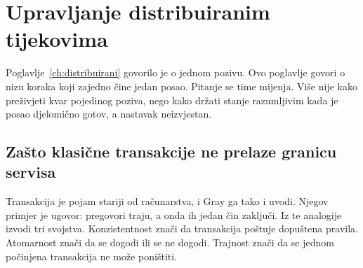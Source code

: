 %
%
\chapter{Upravljanje distribuiranim tijekovima}
\label{ch:tijekovi}

Poglavlje~\ref{ch:distribuirani} govorilo je o jednom pozivu. Ovo poglavlje
govori o nizu koraka koji zajedno čine jedan posao. Pitanje se time mijenja.
Više nije kako preživjeti kvar pojedinog poziva, nego kako držati stanje
razumljivim kada je posao djelomično gotov, a nastavak neizvjestan.

\section{Zašto klasične transakcije ne prelaze granicu servisa}
\label{sec:granica-transakcije}

Transakcija je pojam stariji od računarstva, i Gray ga tako i uvodi. Njegov
primjer je ugovor: pregovori traju, a onda ih jedan čin
zaključi\cite{gray1981transaction}. Iz te analogije izvodi tri svojstva.
Konzistentnost znači da transakcija poštuje dopuštena pravila. Atomarnost
znači da se dogodi ili se ne dogodi. Trajnost znači da se jednom počinjena
transakcija ne može poništiti.

